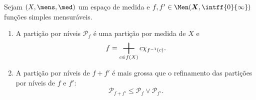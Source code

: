 \begin{prop}
Sejam $(X,\mens,\med)$ um espaço de medida e $f,f' \in \Men(\bm X,\intff{0}{\infty})$ funções simples mensuráveis.
	\begin{enumerate}
	\item A partição por níveis $\mathcal P_f$ é uma partição por medida de $X$ e 
		\begin{equation*}
		f = \sum_{c \in f(X)} c \idc_{f\inv(c)}.
		\end{equation*}

	\item A partição por níveis de $f+f'$ é mais grossa que o refinamento das partições por níveis de $f$ e $f'$:
		\begin{equation*}
		\mathcal P_{f+f'} \leq \mathcal P_f \vee \mathcal P_{f'}.
		\end{equation*}
	\end{enumerate}
\end{prop}

